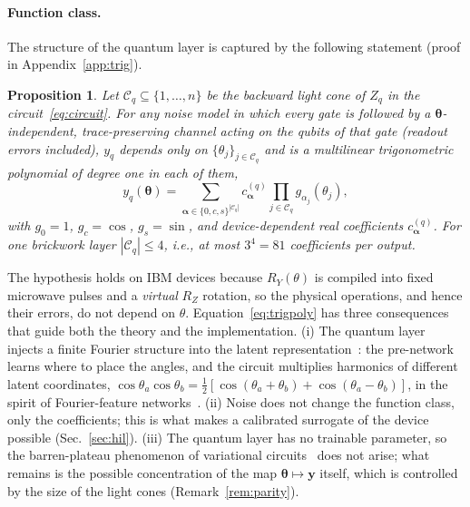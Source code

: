 \documentclass[floatfix,aps,pra,twocolumn,superscriptaddress,10pt,nofootinbib]{revtex4-2}
\newtheorem{proposition}{Proposition}
\begin{document}
\paragraph{Function class.} The structure of the quantum layer is captured by the following statement (proof in Appendix~\ref{app:trig}).
\begin{proposition}\label{prop:trig}
Let $\mathcal C_q\subseteq\{1,\dots,n\}$ be the backward light cone of $Z_q$ in the circuit~\eqref{eq:circuit}. For any noise model in which every gate is followed by a $\bm\theta$-independent, trace-preserving channel acting on the qubits of that gate (readout errors included), $y_q$ depends only on $\{\theta_j\}_{j\in\mathcal C_q}$ and is a multilinear trigonometric polynomial of degree one in each of them,
\begin{equation}
  y_q(\bm\theta)=\sum_{\bm\alpha\in\{0,c,s\}^{|\mathcal C_q|}}c^{(q)}_{\bm\alpha}\prod_{j\in\mathcal C_q}g_{\alpha_j}(\theta_j),
  \label{eq:trigpoly}
\end{equation}
with $g_0=1$, $g_c=\cos$, $g_s=\sin$, and device-dependent real coefficients $c^{(q)}_{\bm\alpha}$. For one brickwork layer $|\mathcal C_q|\le4$, i.e., at most $3^4=81$ coefficients per output.
\end{proposition}
The hypothesis holds on IBM devices because $R_Y(\theta)$ is compiled into fixed microwave pulses and a \emph{virtual} $R_Z$ rotation, so the physical operations, and hence their errors, do not depend on $\theta$. Equation~\eqref{eq:trigpoly} has three consequences that guide both the theory and the implementation. (i) The quantum layer injects a finite Fourier structure into the latent representation~\cite{schuld2021effect}: the pre-network learns where to place the angles, and the circuit multiplies harmonics of different latent coordinates, $\cos\theta_a\cos\theta_b=\tfrac12[\cos(\theta_a+\theta_b)+\cos(\theta_a-\theta_b)]$, in the spirit of Fourier-feature networks~\cite{tancik2020fourier,rahimi2007random}. (ii) Noise does not change the function class, only the coefficients; this is what makes a calibrated surrogate of the device possible (Sec.~\ref{sec:hil}). (iii) The quantum layer has no trainable parameter, so the barren-plateau phenomenon of variational circuits~\cite{mcclean2018barren,cerezo2021cost} does not arise; what remains is the possible concentration of the map $\bm\theta\mapsto\bm y$ itself, which is controlled by the size of the light cones (Remark~\ref{rem:parity}).
\end{document}
